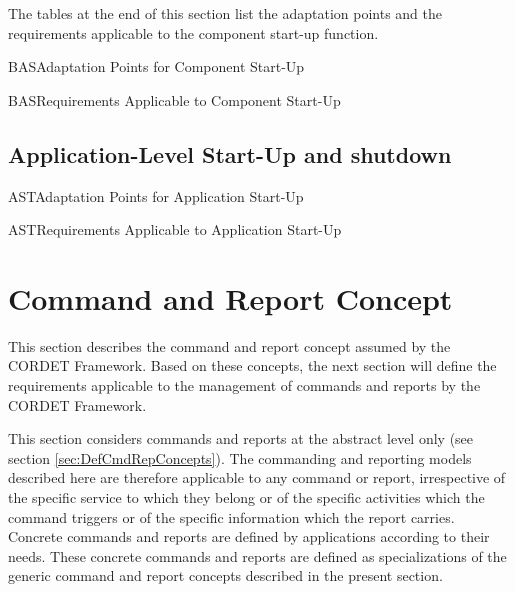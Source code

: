 \documentclass[a4paper,10pt]{article}
\let\stdsection\section
\renewcommand\section{\newpage\stdsection}
\newenvironment{cr_req}[2]
{%
\begin{longtable}{|l|p{9.8cm}|}
\caption{#2} \\
\hline
\rowcolor{light-gray}
\textbf{Req. ID} & \textbf{Requirement Text}\\
\hline\hline
\endfirsthead
\rowcolor{light-gray}
\textbf{Req. ID} & \textbf{Requirement Text}\\
\hline\hline
\endhead
\DTLforeach*[\DTLiseq{\cat}{#1}]{dbReq}{\cat=Category,\type=Type,\id=Id,\reqText=Text}
{\DTLiffirstrow{}{\\\hline}\cat-\id/\type & \textit{\reqText}}\\\hline
}
{\end{longtable}}
\newenvironment{cr_ap}[2]
{%
\begin{longtable}{|l|p{4.7cm}|p{4.9cm}|}
\caption{#2} \\
\hline
\rowcolor{light-gray}
\textbf{AP ID} & \textbf{Adaptation Point} & \textbf{Default Value}\\
\hline\hline
\endfirsthead
\rowcolor{light-gray}
\textbf{AP ID} & \textbf{Adaptation Point} & \textbf{Default Value}\\
\hline\hline
\endhead
\DTLforeach*[\DTLiseq{\cat}{#1}]{dbAP}{\cat=Category,\id=Id,\ap=AP,\defValue=DefValue}
{\DTLiffirstrow{}{\\\hline}\cat-\id & \ap & \defValue}\\\hline
}
{\end{longtable}}
\begin{document}
The tables at the end of this section list the adaptation points and the requirements applicable to the component start-up function.

\begin{cr_ap}{BAS}{Adaptation Points for Component Start-Up}
\end{cr_ap}

\begin{cr_req}{BAS}{Requirements Applicable to Component Start-Up}
\end{cr_req}
 
\subsection{Application-Level Start-Up and shutdown}\label{sec:AppStartUp}



\begin{cr_ap}{AST}{Adaptation Points for Application Start-Up}
\end{cr_ap}

\begin{cr_req}{AST}{Requirements Applicable to Application Start-Up}
\end{cr_req}

\section{Command and Report Concept}\label{sec:CmdAndRepConcept}
This section describes the command and report concept assumed by the CORDET Framework. 
Based on these concepts, the next section will define the requirements applicable to the management of commands and reports by the CORDET Framework.

This section considers commands and reports at the abstract level only (see section \ref{sec:DefCmdRepConcepts}). 
The commanding and reporting models described here are therefore applicable to any command or report, irrespective of the specific service to which they belong or of the specific activities which the command triggers or of the specific information which the report carries. 
Concrete commands and reports are defined by applications according to their needs. 
These concrete commands and reports are defined as specializations of the generic command and report concepts described in the present section. 

\end{document}
